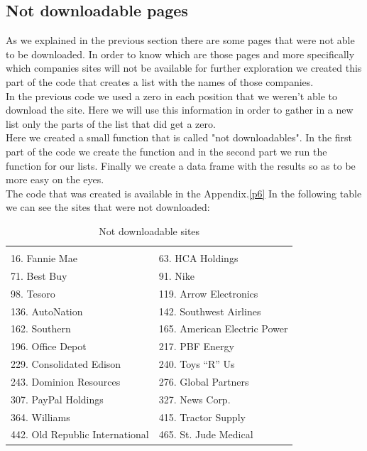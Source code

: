 \documentclass{book}
\begin{document}
\subsection{Not downloadable pages}
As we explained in the previous section there are some pages that were not able to be downloaded. In order to know which are those pages and more specifically which companies sites will not be available for further exploration we created this part of the code that creates a list with the names of those companies.\\
In the previous code we used a zero in each position that we weren't able to download the site. Here we will use this information in order to gather in a new list only the parts of the list that did get a zero.\\
Here we created a small function that is called "not downloadables". In the first part of the code we create the function and in the second part we run the function for our lists. Finally we create a data frame with the results so as to be more easy on the eyes.\\
The code that was created is available in the Appendix.\ref{p6}
In the following table we can see the sites that were not downloaded: 
\begin{table}[H]
\centering
\caption{Not downloadable sites}
\begin{tabular}{ll}
\hline
 &  \\ 
16. Fannie Mae 
& 63. HCA Holdings \\
71. Best Buy
& 91. Nike \\
98. Tesoro 
& 119. Arrow Electronics\\
136. AutoNation
& 142. Southwest Airlines \\
162. Southern 
& 165. American Electric Power\\
196. Office Depot 
& 217. PBF Energy \\
229. Consolidated Edison
& 240. Toys “R” Us \\
243. Dominion Resources 
& 276. Global Partners\\
307. PayPal Holdings 
& 327. News Corp. \\
364. Williams 
& 415. Tractor Supply\\ 
442. Old Republic International 
& 465. St. Jude Medical \\
\hline
\end{tabular}
\end{table}
\end{document}
